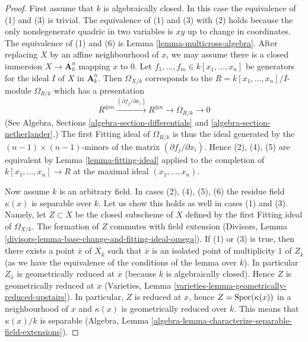 \begin{proof}
First assume that $k$ is algebraically closed.
In this case the equivalence of (1) and (3) is trivial.
The equivalence of (1) and (3) with (2) holds because the only
nondegenerate quadric in two variables is $xy$ up to change in
coordinates. The equivalence of (1) and (6) is 
Lemma \ref{lemma-multicross-algebra}.
After replacing $X$ by an affine neighbourhood
of $x$, we may assume there is a closed immersion $X \to \mathbf{A}^n_k$
mapping $x$ to $0$. Let $f_1, \ldots, f_m \in k[x_1, \ldots, x_n]$
be generators for the ideal $I$ of $X$ in $\mathbf{A}^n_k$.
Then $\Omega_{X/k}$ corresponds to the $R = k[x_1, \ldots, x_n]/I$-module
$\Omega_{R/k}$ which has a presentation
$$
R^{\oplus m} \xrightarrow{(\partial f_j/\partial x_i)}
R^{\oplus n} \to \Omega_{R/k} \to 0
$$
(See Algebra, Sections \ref{algebra-section-differentials} and
\ref{algebra-section-netherlander}.)
The first Fitting ideal of $\Omega_{R/k}$ is thus the ideal
generated by the $(n - 1) \times (n - 1)$-minors of the
matrix $(\partial f_j/\partial x_i)$. Hence (2), (4), (5)
are equivalent by Lemma \ref{lemma-fitting-ideal} applied
to the completion of $k[x_1, \ldots, x_n] \to R$
at the maximal ideal $(x_1, \ldots, x_n)$.

\medskip\noindent
Now assume $k$ is an arbitrary field.
In cases (2), (4), (5), (6) the residue field $\kappa(x)$ is
separable over $k$. Let us show this holds as well
in cases (1) and (3). Namely, let $Z \subset X$ be the closed subscheme
of $X$ defined by the first Fitting ideal of $\Omega_{X/k}$.
The formation of $Z$ commutes with field extension
(Divisors, Lemma \ref{divisors-lemma-base-change-and-fitting-ideal-omega}).
If (1) or (3) is true, then there exists a point
$\overline{x}$ of $X_{\overline{k}}$ such that $\overline{x}$
is an isolated point of multiplicity $1$ of $Z_{\overline{k}}$ (as we have the
equivalence of the conditions of the lemma over $\overline{k}$).
In particular $Z_{\overline{x}}$ is geometrically reduced at $\overline{x}$
(because $\overline{k}$ is algebraically closed). Hence
$Z$ is geometrically reduced at $x$
(Varieties, Lemma \ref{varieties-lemma-geometrically-reduced-upstairs}).
In particular, $Z$ is reduced at $x$, hence $Z = \mathop{\mathrm{Spec}}(\kappa(x))$
in a neighbourhood of $x$ and $\kappa(x)$ is geometrically reduced
over $k$. This means that $\kappa(x)/k$ is separable
(Algebra, Lemma \ref{algebra-lemma-characterize-separable-field-extensions}).


\end{proof}

